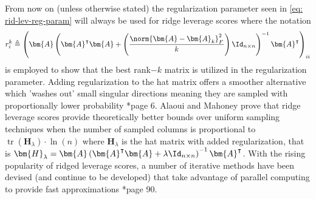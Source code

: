 From now on (unless otherwise stated) the regularization parameter seen in \ref{eq: rid-lev-reg-param} will always be used for ridge leverage scores where the notation
\begin{equation*}
    r_{i}^{k} \triangleq \left( \bm{A} \left( \bm{A}^{\intercal} \bm{A} + \left( \frac{\norm{\bm{A} - \bm{A}_k}_F^{2}}{k} \right) \Id_{n \times n} \right)^{-1} \bm{A}^{\intercal} \right)_{ii}
\end{equation*}
is employed to show that the best rank$-k$ matrix is utilized in the regularization parameter. Adding regularization to the hat matrix offers a smoother alternative which 'washes out' small singular directions meaning they are sampled with proportionally lower probability \cite{DBLP:journals/corr/CohenMM15}*{page 6}. Alaoui and Mahoney \cite{NIPS2015_f3f27a32} prove that ridge leverage scores provide theoretically better bounds over uniform sampling techniques when the number of sampled columns is proportional to $\operatorname{tr} \left( \bm{H}_{\lambda} \right) \cdot \ln \left( n \right)$ where $\bm{H}_{\lambda}$ is the hat matrix with added regularization, that is $\bm{H}_{\lambda} = \bm{A} \left( \bm{A}^{\intercal} \bm{A} + \lambda \Id_{n \times n} \right)^{-1} \bm{A}^{\intercal}$. With the rising popularity of ridged leverage scores, a number of iterative methods have been devised (and continue to be developed) that take advantage of parallel computing to provide fast approximations \cite{martinsson2021randomized}*{page 90}.